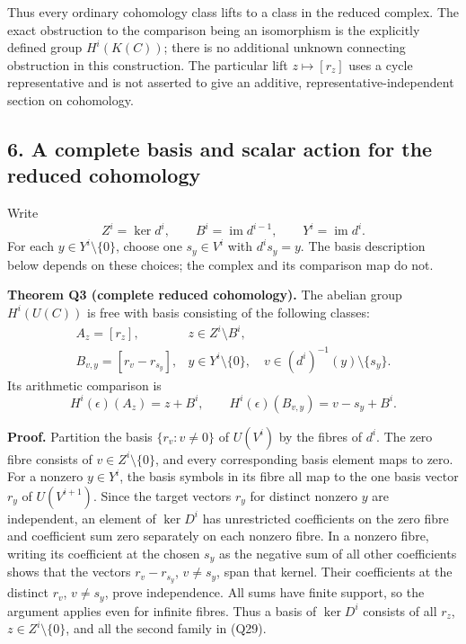 \documentclass[
]{article}
\begin{document}
Thus every ordinary cohomology class lifts to a class in the reduced
complex. The exact obstruction to the comparison being an isomorphism is
the explicitly defined group \(H^i(K(C))\); there is no additional
unknown connecting obstruction in this construction. The particular lift
\(z\mapsto[r_z]\) uses a cycle representative and is not asserted to
give an additive, representative-independent section on cohomology.

\subsection{6. A complete basis and scalar action for the reduced
cohomology}\label{a-complete-basis-and-scalar-action-for-the-reduced-cohomology}

Write \[
Z^i=\ker d^i,\qquad B^i=\operatorname{im}d^{i-1},\qquad Y^i=\operatorname{im}d^i.
\tag{Q28}
\] For each \(y\in Y^i\setminus\{0\}\), choose one \(s_y\in V^i\) with
\(d^is_y=y\). The basis description below depends on these choices; the
complex and its comparison map do not.

\textbf{Theorem Q3 (complete reduced cohomology).} The abelian group
\(H^i(U(C))\) is free with basis consisting of the following classes: \[
\begin{array}{ll}
A_z=[r_z],&z\in Z^i\setminus B^i,\\
B_{v,y}=[r_v-r_{s_y}],&y\in Y^i\setminus\{0\},\quad
v\in(d^i)^{-1}(y)\setminus\{s_y\}.
\end{array}
\tag{Q29}
\] Its arithmetic comparison is \[
H^i(\epsilon)(A_z)=z+B^i,
\qquad H^i(\epsilon)(B_{v,y})=v-s_y+B^i.
\tag{Q30}
\]

\textbf{Proof.} Partition the basis \(\{r_v:v\ne0\}\) of \(U(V^i)\) by
the fibres of \(d^i\). The zero fibre consists of
\(v\in Z^i\setminus\{0\}\), and every corresponding basis element maps
to zero. For a nonzero \(y\in Y^i\), the basis symbols in its fibre all
map to the one basis vector \(r_y\) of \(U(V^{i+1})\). Since the target
vectors \(r_y\) for distinct nonzero \(y\) are independent, an element
of \(\ker D^i\) has unrestricted coefficients on the zero fibre and
coefficient sum zero separately on each nonzero fibre. In a nonzero
fibre, writing its coefficient at the chosen \(s_y\) as the negative sum
of all other coefficients shows that the vectors \(r_v-r_{s_y}\),
\(v\ne s_y\), span that kernel. Their coefficients at the distinct
\(r_v\), \(v\ne s_y\), prove independence. All sums have finite support,
so the argument applies even for infinite fibres. Thus a basis of
\(\ker D^i\) consists of all \(r_z\), \(z\in Z^i\setminus\{0\}\), and
all the second family in (Q29).
\end{document}
